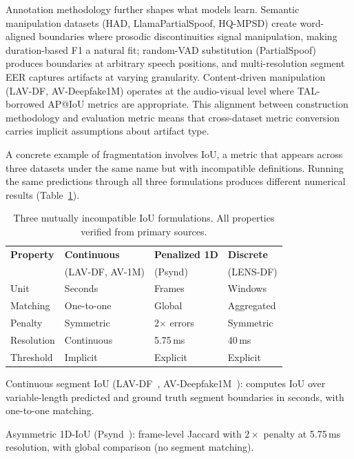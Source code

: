\documentclass[journal]{IEEEtran}
\begin{document}
Annotation methodology further shapes what models learn. Semantic manipulation datasets (HAD, LlamaPartialSpoof, HQ-MPSD) create word-aligned boundaries where prosodic discontinuities signal manipulation, making duration-based F1 a natural fit; random-VAD substitution (PartialSpoof) produces boundaries at arbitrary speech positions, and multi-resolution segment EER captures artifacts at varying granularity. Content-driven manipulation (LAV-DF, AV-Deepfake1M) operates at the audio-visual level where TAL-borrowed AP@IoU metrics are appropriate. This alignment between construction methodology and evaluation metric means that cross-dataset metric conversion carries implicit assumptions about artifact type.

A concrete example of fragmentation involves IoU, a metric that appears across three datasets under the same name but with incompatible definitions. Running the same predictions through all three formulations produces different numerical results (Table~\ref{tab:iou_compare}).

\begin{table}[t]
\centering
\caption{Three mutually incompatible IoU formulations. All properties verified from primary sources.}
\label{tab:iou_compare}
\small
\begin{tabular}{p{1.7cm}p{1.8cm}p{1.8cm}p{1.8cm}}
\toprule
\textbf{Property} & \textbf{Continuous} & \textbf{Penalized 1D} & \textbf{Discrete} \\
 & (LAV-DF, AV-1M) & (Psynd) & (LENS-DF) \\
\midrule
Unit & Seconds & Frames & Windows \\
Matching & One-to-one & Global & Aggregated \\
Penalty & Symmetric & 2$\times$ errors & Symmetric \\
Resolution & Continuous & 5.75\,ms & 40\,ms \\
Threshold & Implicit & Explicit & Explicit \\
\bottomrule
\end{tabular}
\end{table}

Continuous segment IoU (LAV-DF~\cite{cai2022lavdf}, AV-Deepfake1M~\cite{cai2024avdeepfake1m}): computes IoU over variable-length predicted and ground truth segment boundaries in seconds, with one-to-one matching.

Asymmetric 1D-IoU (Psynd~\cite{zhang2022localizing}): frame-level Jaccard with $2\times$ penalty at 5.75\,ms resolution, with global comparison (no segment matching).
\end{document}
